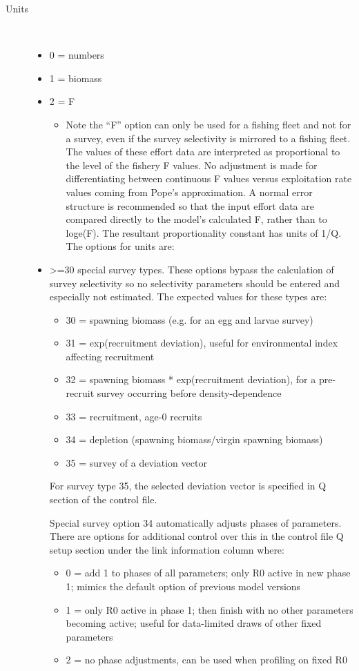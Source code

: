 \begin{description}
	\item[\hypertarget{IndexUnits}{Units}]\hfill\\	
	\begin{itemize}
		\item 0  = numbers
		\item 1  = biomass
		\item 2  = F
		\begin{itemize}
			\item 	Note the “F” option can only be used for a fishing fleet and not for a survey, even if the survey selectivity is mirrored to a fishing fleet.  The values of these effort data are interpreted as proportional to the level of the fishery F values.  No adjustment is made for differentiating between continuous F values versus exploitation rate values coming from Pope’s approximation.  A normal error structure is recommended so that the input effort data are compared directly to the model’s calculated F, rather than to loge(F).  The resultant proportionality constant has units of 1/Q. The options for units are:	
		\end{itemize}
		\item >=30 special survey types.  These options bypass the calculation of survey selectivity so no selectivity parameters should be entered and especially not estimated.  The expected values for these types are:
		\begin{itemize}
			\item 30 = spawning biomass (e.g. for an egg and larvae survey)
			\item 31 = exp(recruitment deviation), useful for environmental index affecting recruitment
			\item 32 = spawning biomass * exp(recruitment deviation), for a pre-recruit survey occurring before density-dependence
			\item 33 = recruitment, age-0 recruits
			\item 34 = depletion (spawning biomass/virgin spawning biomass)
			\item 35 = survey of a deviation vector
		\end{itemize}
	    For survey type 35, the selected deviation vector is specified in Q section of the control file. 
	     
	    \setlength{\parindent}{25pt}
	    Special survey option 34 automatically adjusts phases of parameters.  There are options for additional control over this in the control file Q setup section under the link information column where:
	    \begin{itemize}
		    \item 0 = add 1 to phases of all parameters; only R0 active in new phase 1; mimics the default option of previous model versions
		    \item 1 = only R0 active in phase 1; then finish with no other parameters becoming active; useful for data-limited draws of other fixed parameters
		    \item 2 = no phase adjustments, can be used when profiling on fixed R0
	    \end{itemize}
	\end{itemize}
	

\end{description}
